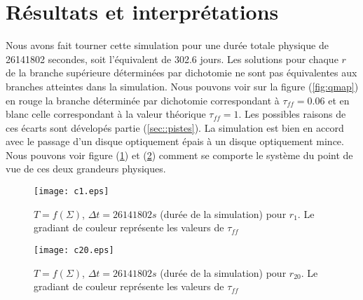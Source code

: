 \section{Résultats et interprétations}

Nous avons fait tourner cette simulation pour une durée totale physique de 26141802 secondes, soit l'équivalent de 302.6 jours. 
Les solutions pour chaque $r$ de la branche supérieure déterminées par dichotomie ne sont pas équivalentes aux branches atteintes dans la simulation. Nous pouvons voir sur la figure (\ref{fig:qmap}) en rouge la branche déterminée par dichotomie correspondant à $\tau_{ff} = 0.06 $ et en blanc celle correspondant à la valeur théorique $\tau_{ff} = 1$. Les possibles raisons de ces écarts sont dévelopés partie (\ref{sec::pistes}). La simulation est bien en accord avec le passage d'un disque optiquement épais à un disque optiquement mince. Nous pouvons voir figure (\ref{fig:c1.eps}) et (\ref{fig:c20.eps}) comment se comporte le système du point de vue de ces deux grandeurs physiques.  \\
 

\begin{figure}
  \begin{center}
    \texttt{[image: c1.eps]}
  \end{center}
  \caption{$T=f(\Sigma)$, $\Delta t = 26141802 s$ (durée de la simulation) pour $r_{1}$. Le gradiant de couleur représente les valeurs de $\tau_{ff}$}
  \label{fig:c1.eps}
\end{figure} 

\begin{figure}
  \begin{center}
    \texttt{[image: c20.eps]}
  \end{center}
  \caption{$T=f(\Sigma)$, $\Delta t = 26141802 s$ (durée de la simulation) pour $r_{20}$. Le gradiant de couleur représente les valeurs de $\tau_{ff}$}
  \label{fig:c20.eps}
\end{figure}


